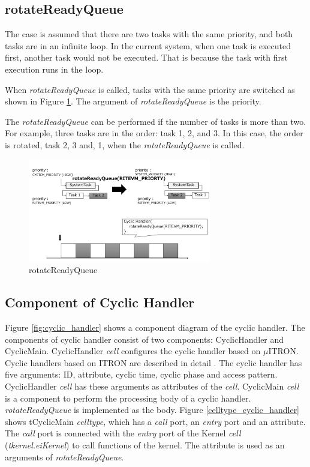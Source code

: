 \documentclass[conference,compsoc]{IEEEtran}
\begin{document}
\subsection{rotateReadyQueue}
The case is assumed that there are two tasks with the same priority, and both tasks are in an infinite loop.
In the current system, when one task is executed first, another task would not be executed.
That is because the task with first execution runs in the loop.

When {\it rotateReadyQueue} is called, tasks with the same priority are switched as shown in Figure \ref{fig:rotateReadyQueue}.
The argument of {\it rotateReadyQueue} is the priority.

The {\it rotateReadyQueue} can be performed if the number of tasks is more than two.
For example, three tasks are in the order: task 1, 2, and 3.
In this case, the order is rotated, task 2, 3 and, 1, when the {\it rotateReadyQueue} is called.

\begin{figure}[t]
    \centering
    \includegraphics[width=8cm,clip]{figure/rotateReadyQueue.pdf}
    \caption{rotateReadyQueue}
    \label{fig:rotateReadyQueue}
\end{figure}

\subsection{Component of Cyclic Handler}
Figure \ref{fig:cyclic_handler} shows a component diagram of the cyclic handler.
The components of cyclic handler consist of two components: CyclicHandler and CyclicMain.
CyclicHandler {\it cell} configures the cyclic handler based on $\mu$ITRON.
Cyclic handlers based on ITRON are described in detail \cite{par:microITRON}.
The cyclic handler has five arguments: ID, attribute, cyclic time, cyclic phase and access pattern.
CyclicHandler {\it cell} has these arguments as attributes of the {\it cell}.
CyclicMain {\it cell} is a component to perform the processing body of a cyclic handler.
{\it rotateReadyQueue} is implemented as the body.
Figure \ref{celltype_cyclic_handler} shows tCyclicMain {\it celltype}, which has a {\it call} port, an {\it entry} port and an attribute.
The {\it call} port is connected with the {\it entry} port of the Kernel {\it cell} ({\it tkernel.eiKernel}) to call functions of the kernel. 
The attribute is used as an arguments of {\it rotateReadyQueue}.
\end{document}
